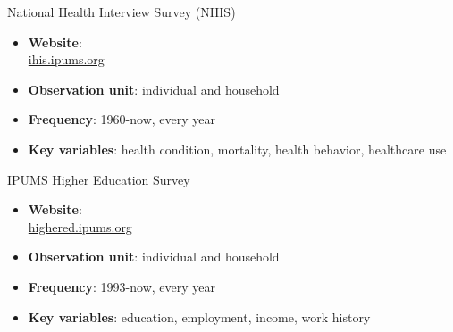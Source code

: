 \documentclass[hyperref={pdfpagelabels=false}]{beamer}
\begin{document}
\begin{frame}{National Health Interview Survey (NHIS)}
\begin{itemize} 
\item \textbf{Website}:  \\ \href{https://ihis.ipums.org/ihis}{ihis.ipums.org} 
\vspace{0.2cm}
\item \textbf{Observation unit}: individual and household
\vspace{0.2cm}
\item \textbf{Frequency}: 1960-now, every year 
\vspace{0.2cm}
\item \textbf{Key variables}: health condition, mortality, health behavior, healthcare use 


\end{itemize}
\end{frame}



\begin{frame}{IPUMS Higher Education Survey}
\begin{itemize} 
\item \textbf{Website}:  \\ \href{https://highered.ipums.org/highered}{highered.ipums.org} 
\vspace{0.2cm}
\item \textbf{Observation unit}: individual and household
\vspace{0.2cm}
\item \textbf{Frequency}: 1993-now, every year 
\vspace{0.2cm}
\item \textbf{Key variables}: education, employment, income, work history


\end{itemize}
\end{frame}
\end{document}
